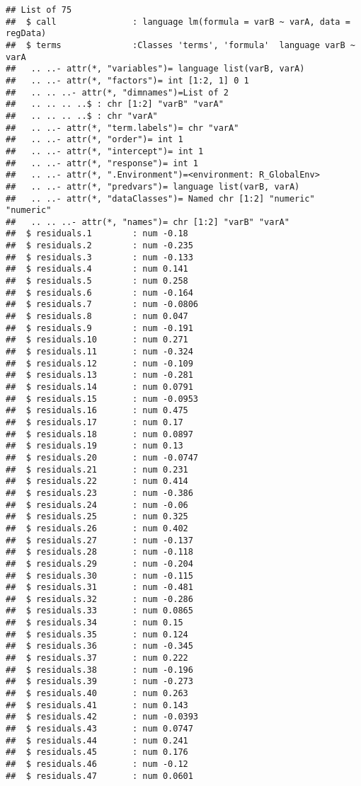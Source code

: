 \documentclass[
]{article}
\begin{document}
\begin{verbatim}
## List of 75
##  $ call               : language lm(formula = varB ~ varA, data = regData)
##  $ terms              :Classes 'terms', 'formula'  language varB ~ varA
##   .. ..- attr(*, "variables")= language list(varB, varA)
##   .. ..- attr(*, "factors")= int [1:2, 1] 0 1
##   .. .. ..- attr(*, "dimnames")=List of 2
##   .. .. .. ..$ : chr [1:2] "varB" "varA"
##   .. .. .. ..$ : chr "varA"
##   .. ..- attr(*, "term.labels")= chr "varA"
##   .. ..- attr(*, "order")= int 1
##   .. ..- attr(*, "intercept")= int 1
##   .. ..- attr(*, "response")= int 1
##   .. ..- attr(*, ".Environment")=<environment: R_GlobalEnv> 
##   .. ..- attr(*, "predvars")= language list(varB, varA)
##   .. ..- attr(*, "dataClasses")= Named chr [1:2] "numeric" "numeric"
##   .. .. ..- attr(*, "names")= chr [1:2] "varB" "varA"
##  $ residuals.1        : num -0.18
##  $ residuals.2        : num -0.235
##  $ residuals.3        : num -0.133
##  $ residuals.4        : num 0.141
##  $ residuals.5        : num 0.258
##  $ residuals.6        : num -0.164
##  $ residuals.7        : num -0.0806
##  $ residuals.8        : num 0.047
##  $ residuals.9        : num -0.191
##  $ residuals.10       : num 0.271
##  $ residuals.11       : num -0.324
##  $ residuals.12       : num -0.109
##  $ residuals.13       : num -0.281
##  $ residuals.14       : num 0.0791
##  $ residuals.15       : num -0.0953
##  $ residuals.16       : num 0.475
##  $ residuals.17       : num 0.17
##  $ residuals.18       : num 0.0897
##  $ residuals.19       : num 0.13
##  $ residuals.20       : num -0.0747
##  $ residuals.21       : num 0.231
##  $ residuals.22       : num 0.414
##  $ residuals.23       : num -0.386
##  $ residuals.24       : num -0.06
##  $ residuals.25       : num 0.325
##  $ residuals.26       : num 0.402
##  $ residuals.27       : num -0.137
##  $ residuals.28       : num -0.118
##  $ residuals.29       : num -0.204
##  $ residuals.30       : num -0.115
##  $ residuals.31       : num -0.481
##  $ residuals.32       : num -0.286
##  $ residuals.33       : num 0.0865
##  $ residuals.34       : num 0.15
##  $ residuals.35       : num 0.124
##  $ residuals.36       : num -0.345
##  $ residuals.37       : num 0.222
##  $ residuals.38       : num -0.196
##  $ residuals.39       : num -0.273
##  $ residuals.40       : num 0.263
##  $ residuals.41       : num 0.143
##  $ residuals.42       : num -0.0393
##  $ residuals.43       : num 0.0747
##  $ residuals.44       : num 0.241
##  $ residuals.45       : num 0.176
##  $ residuals.46       : num -0.12
##  $ residuals.47       : num 0.0601

\end{verbatim}
\end{document}

